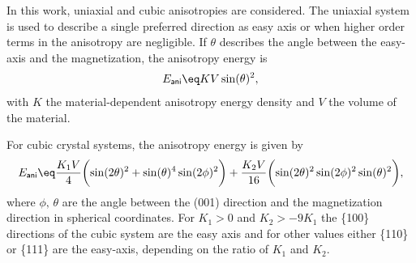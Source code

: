 \documentclass[\main/dresen_thesis.tex]{subfiles}
\begin{document}
      In this work, uniaxial and cubic anisotropies are considered.
      The uniaxial system is used to describe a single preferred direction as easy axis or when higher order terms in the anisotropy are negligible.
      If $\theta$ describes the angle between the easy-axis and the magnetization, the anisotropy energy is
      \begin{align}
        E_\mathsf{ani} \eq K V \sin(\theta)^2,
      \end{align}
      with $K$ the material-dependent anisotropy energy density and $V$ the volume of the material.

      For cubic crystal systems, the anisotropy energy is given by
      \begin{align}
        E_\mathsf{ani} \eq
          \frac{K_1 V}{4} \biggl(\sin(2 \theta)^2 + \sin(\theta)^4 \sin(2\phi)^2 \biggr) +
          \frac{K_2 V}{16} \biggl( \sin(2 \theta)^2 \sin(2 \phi)^2 \sin(\theta)^2 \biggr),
      \end{align}
      where $\phi, \, \theta$ are the angle between the (001) direction and the magnetization direction in spherical coordinates.
      For $K_1 > 0$ and $K_2 > -9 K_1$ the \{100\} directions of the cubic system are the easy axis and for other values either \{110\} or \{111\} are the easy-axis, depending on the ratio of $K_1$ and $K_2$.
\end{document}

